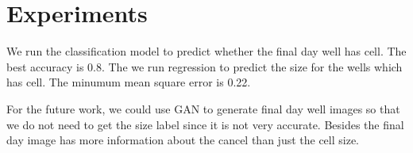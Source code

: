 \documentclass[10pt,twocolumn,letterpaper]{article}
\begin{document}
 \section{Experiments}
 We run the classification model to predict whether the final day well has cell. The best accuracy is 0.8. The we run regression to predict the size for the wells which has cell. The minumum mean square error is 0.22. 

For the future work, we could use GAN to generate final day well images so that we do not need to get the size label since it is not very accurate. Besides the final day image has more information about the cancel than just the cell size. 


\

{\small


}
\end{document}
